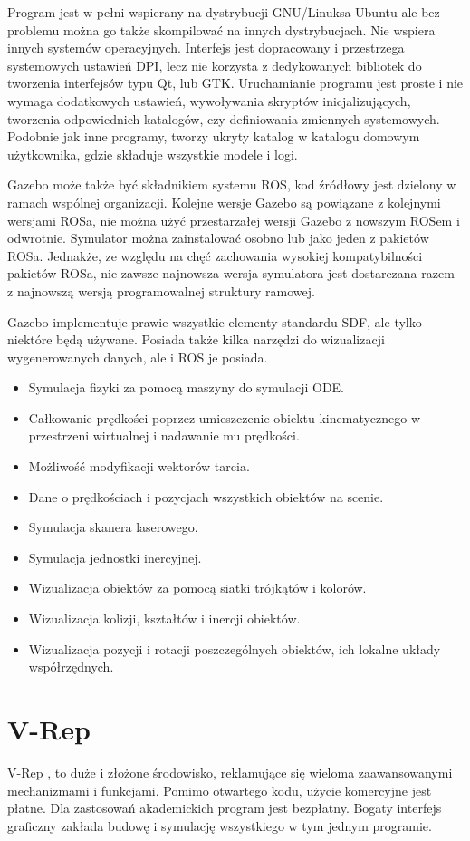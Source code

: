 	Program jest w pełni wspierany na dystrybucji GNU/Linuksa Ubuntu ale bez problemu można go także skompilować na innych dystrybucjach.
	Nie wspiera innych systemów operacyjnych.
	Interfejs jest dopracowany i przestrzega systemowych ustawień DPI, lecz nie korzysta z dedykowanych bibliotek do tworzenia 
	interfejsów typu Qt, lub GTK.
	Uruchamianie programu jest proste i nie wymaga dodatkowych ustawień, wywoływania skryptów inicjalizujących, 
	tworzenia odpowiednich katalogów, czy definiowania zmiennych systemowych.
	Podobnie jak inne programy, tworzy ukryty katalog w katalogu domowym użytkownika, gdzie składuje wszystkie modele i logi.

	Gazebo może także być składnikiem systemu ROS, kod źródłowy jest dzielony w ramach wspólnej organizacji.
	Kolejne wersje Gazebo są powiązane z kolejnymi wersjami ROSa, nie można użyć przestarzałej wersji Gazebo z nowszym ROSem i odwrotnie.
	Symulator można zainstalować osobno lub jako jeden z pakietów ROSa.
	Jednakże, ze względu na chęć zachowania wysokiej kompatybilności pakietów ROSa, nie zawsze najnowsza wersja symulatora jest dostarczana razem z najnowszą wersją programowalnej struktury ramowej.
	
	Gazebo implementuje prawie wszystkie elementy standardu SDF, ale tylko niektóre będą używane. Posiada także kilka narzędzi do wizualizacji wygenerowanych danych, ale i ROS je posiada.
	\begin{itemize}
		\item Symulacja fizyki za pomocą maszyny do symulacji ODE.
		\item Całkowanie prędkości poprzez umieszczenie obiektu kinematycznego w przestrzeni wirtualnej i nadawanie mu prędkości.
		\item Możliwość modyfikacji wektorów tarcia.
		\item Dane o prędkościach i pozycjach wszystkich obiektów na scenie.
		\item Symulacja skanera laserowego.
		\item Symulacja jednostki inercyjnej.
		\item Wizualizacja obiektów za pomocą siatki trójkątów i kolorów.
		\item Wizualizacja kolizji, kształtów i inercji obiektów.
		\item Wizualizacja pozycji i rotacji poszczególnych obiektów, ich lokalne układy współrzędnych.
	\end{itemize}

\section{V-Rep}
	V-Rep \cite{vrep_website}, to duże i złożone środowisko, reklamujące się wieloma zaawansowanymi mechanizmami i funkcjami.
	Pomimo otwartego kodu, użycie komercyjne jest płatne. Dla zastosowań akademickich program jest bezpłatny.
	Bogaty interfejs graficzny zakłada budowę i symulację wszystkiego w tym jednym programie.

